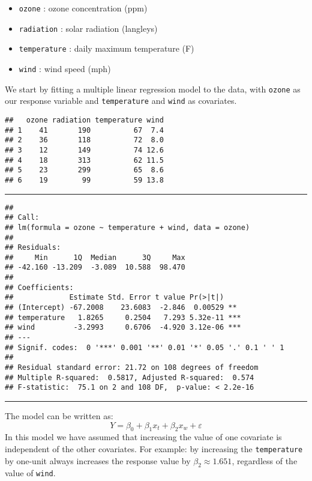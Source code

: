 \documentclass[]{article}
\providecommand{\tightlist}{%
  \setlength{\itemsep}{0pt}\setlength{\parskip}{0pt}}
\begin{document}
\begin{itemize}
\tightlist
\item
  \texttt{ozone} : ozone concentration (ppm)
\item
  \texttt{radiation} : solar radiation (langleys)
\item
  \texttt{temperature} : daily maximum temperature (F)
\item
  \texttt{wind} : wind speed (mph)
\end{itemize}

We start by fitting a multiple linear regression model to the data, with
\texttt{ozone} as our response variable and \texttt{temperature} and
\texttt{wind} as covariates.

\begin{verbatim}
##   ozone radiation temperature wind
## 1    41       190          67  7.4
## 2    36       118          72  8.0
## 3    12       149          74 12.6
## 4    18       313          62 11.5
## 5    23       299          65  8.6
## 6    19        99          59 13.8
\end{verbatim}

\begin{center}\rule{0.5\linewidth}{\linethickness}\end{center}

\small

\begin{verbatim}
## 
## Call:
## lm(formula = ozone ~ temperature + wind, data = ozone)
## 
## Residuals:
##     Min      1Q  Median      3Q     Max 
## -42.160 -13.209  -3.089  10.588  98.470 
## 
## Coefficients:
##             Estimate Std. Error t value Pr(>|t|)    
## (Intercept) -67.2008    23.6083  -2.846  0.00529 ** 
## temperature   1.8265     0.2504   7.293 5.32e-11 ***
## wind         -3.2993     0.6706  -4.920 3.12e-06 ***
## ---
## Signif. codes:  0 '***' 0.001 '**' 0.01 '*' 0.05 '.' 0.1 ' ' 1
## 
## Residual standard error: 21.72 on 108 degrees of freedom
## Multiple R-squared:  0.5817, Adjusted R-squared:  0.574 
## F-statistic:  75.1 on 2 and 108 DF,  p-value: < 2.2e-16
\end{verbatim}

\normalsize

\begin{center}\rule{0.5\linewidth}{\linethickness}\end{center}

The model can be written as:
\[Y = \beta_0 + \beta_1 x_t + \beta_2 x_w + \varepsilon\] In this model
we have assumed that increasing the value of one covariate is
independent of the other covariates. For example: by increasing the
\texttt{temperature} by one-unit always increases the response value by
\(\beta_2 \approx 1.651\), regardless of the value of \texttt{wind}.
\end{document}
